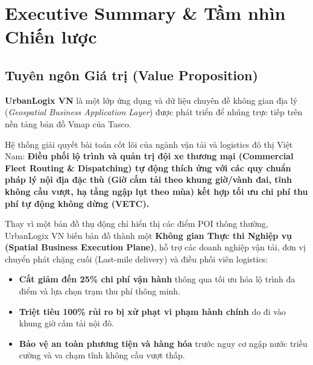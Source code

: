 \documentclass[11pt,a4paper]{article}
\begin{document}
\newpage
{
  \hypersetup{linkcolor=darkslate}
  \tableofcontents
}
\newpage

\section{Executive Summary \& Tầm nhìn Chiến lược}

\subsection{Tuyên ngôn Giá trị (Value Proposition)}
\textbf{UrbanLogix VN} là một lớp ứng dụng và dữ liệu chuyên đề không gian địa lý (\textit{Geospatial Business Application Layer}) được phát triển để nhúng trực tiếp trên nền tảng bản đồ Vmap của Tasco.

Hệ thống giải quyết bài toán cốt lõi của ngành vận tải và logistics đô thị Việt Nam: \textbf{Điều phối lộ trình và quản trị đội xe thương mại (Commercial Fleet Routing \& Dispatching) tự động thích ứng với các quy chuẩn pháp lý nội địa đặc thù (Giờ cấm tải theo khung giờ/vành đai, tĩnh không cầu vượt, hạ tầng ngập lụt theo mùa) kết hợp tối ưu chi phí thu phí tự động không dừng (VETC).}

Thay vì một bản đồ thụ động chỉ hiển thị các điểm POI thông thường, UrbanLogix VN biến bản đồ thành một \textbf{Không gian Thực thi Nghiệp vụ (Spatial Business Execution Plane)}, hỗ trợ các doanh nghiệp vận tải, đơn vị chuyển phát chặng cuối (Last-mile delivery) và điều phối viên logistics:
\begin{itemize}
  \item \textbf{Cắt giảm đến 25\% chi phí vận hành} thông qua tối ưu hóa lộ trình đa điểm và lựa chọn trạm thu phí thông minh.
  \item \textbf{Triệt tiêu 100\% rủi ro bị xử phạt vi phạm hành chính} do đi vào khung giờ cấm tải nội đô.
  \item \textbf{Bảo vệ an toàn phương tiện và hàng hóa} trước nguy cơ ngập nước triều cường và va chạm tĩnh không cầu vượt thấp.
\end{itemize}
\end{document}
